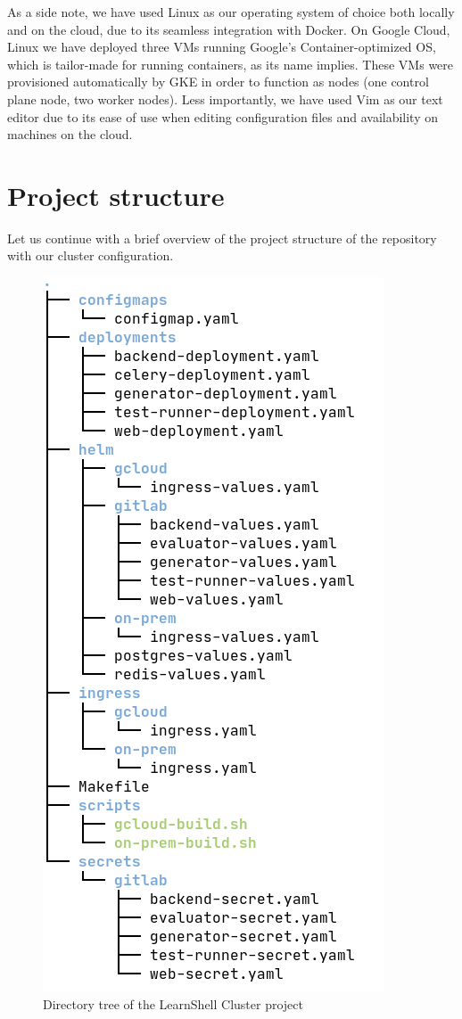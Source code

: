 \documentclass[thesis=B,english]{FITthesis}[2019/12/23]
\begin{document}
As a side note, we have used Linux as our operating system of choice both locally and on the cloud, due to its seamless integration with Docker. On Google Cloud, Linux we have deployed three VMs running Google's Container-optimized OS, which is tailor-made for running containers, as its name implies. These VMs were provisioned automatically by GKE in order to function as nodes (one control plane node, two worker nodes).
\newline
Less importantly, we have used Vim as our text editor due to its ease of use when editing configuration files and availability on machines on the cloud. 



\section{Project structure}

Let us continue with a brief overview of the project structure of the repository with our cluster configuration.

\begin{figure}[H]
\caption{Directory tree of the LearnShell Cluster project}
\includegraphics[scale=0.5]{tree-white-bg}
\end{figure}
\end{document}
